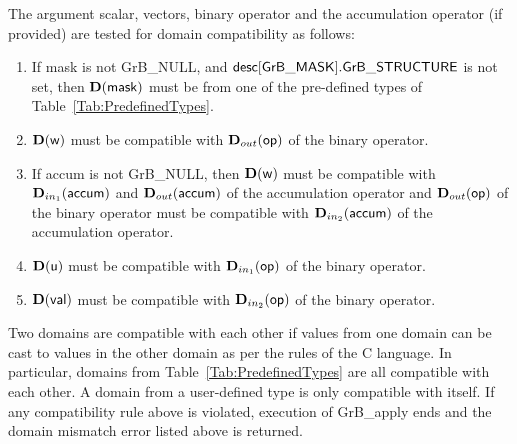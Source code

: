 The argument scalar, vectors, binary operator and the accumulation 
operator (if provided) are tested for domain compatibility as follows:
\begin{enumerate}
	\item If {\sf mask} is not {\sf GrB\_NULL}, and ${\sf desc[GrB\_MASK].GrB\_STRUCTURE}$
    is not set, then $\bold{D}({\sf mask})$ must be from one of the pre-defined types of 
    Table~\ref{Tab:PredefinedTypes}.

	\item $\bold{D}({\sf w})$ must be compatible with $\mbox{$\mathbf{D}_{out}$}({\sf op})$ of the binary operator.

	\item If {\sf accum} is not {\sf GrB\_NULL}, then $\bold{D}({\sf w})$ must be
    compatible with $\mbox{$\mathbf{D}_{in_{1}}$}({\sf accum})$ and $\mbox{$\mathbf{D}_{out}$}({\sf accum})$ of the accumulation operator and 
    $\mbox{$\mathbf{D}_{out}$}({\sf op})$ of the binary operator must be compatible with $\mbox{$\mathbf{D}_{in_{2}}$}({\sf accum})$ of the accumulation operator.

	\item $\bold{D}({\sf u})$ must be compatible with $\mbox{$\mathbf{D}_{in_{1}}$}({\sf op})$ of the binary operator.
    
	\item $\bold{D}({\sf val})$ must be compatible with $\mbox{$\mathbf{D}_{in_{2}}$}({\sf op})$ of the binary operator.
\end{enumerate}
Two domains are compatible with each other if values from one domain can be cast 
to values in the other domain as per the rules of the C language.
In particular, domains from Table~\ref{Tab:PredefinedTypes} are all compatible 
with each other. A domain from a user-defined type is only compatible with itself.
If any compatibility rule above is violated, execution of {\sf GrB\_apply} ends
and the domain mismatch error listed above is returned.

